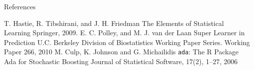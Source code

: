 
\appendix
\begin{frame}[allowframebreaks]{References}
\begin{thebibliography}{9}
	 T. Hastie, R. Tibshirani, and J. H. Friedman
	\newblock The Elements of Statistical Learning
	\newblock Springer, 2009.
	 E. C. Polley, and M. J. van der Laan
	\newblock Super Learner in Prediction
	\newblock U.C. Berkeley Division of Biostatistics Working Paper Series. Working Paper 266, 2010
	 M. Culp, K. Johnson and G. Michailidis
	\newblock \texttt{ada}: The R Package Ada for Stochastic Boosting
	\newblock Journal of Statistical Software, 17(2), 1–27, 2006
\end{thebibliography}
\end{frame}
